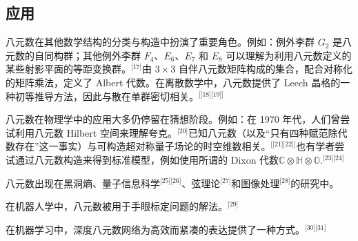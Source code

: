 \subsection{应用}
八元数在其他数学结构的分类与构造中扮演了重要角色。例如：例外李群 $G_{2}$ 是八元数的自同构群；其他例外李群 $F_{4}$、$E_{6}$、$E_{7}$ 和 $E_{8}$ 可以理解为利用八元数定义的某些射影平面的等距变换群。\(^\text{[17]}\)由 $3\times 3$ 自伴八元数矩阵构成的集合，配合对称化的矩阵乘法，定义了 Albert 代数。在离散数学中，八元数提供了 Leech 晶格的一种初等推导方法，因此与散在单群密切相关。\(^\text{[[18][19]]}\)

八元数在物理学中的应用大多仍停留在猜想阶段。例如：在 1970 年代，人们曾尝试利用八元数 Hilbert 空间来理解夸克。\(^\text{[20]}\)已知八元数（以及“只有四种赋范除代数存在”这一事实）与可构造超对称量子场论的时空维数相关。\(^\text{[[21][22]]}\)也有学者尝试通过八元数构造来得到标准模型，例如使用所谓的 Dixon 代数$\mathbb{C} \otimes \mathbb{H} \otimes \mathbb{O}$.\(^\text{[23][24]}\)

八元数出现在黑洞熵、量子信息科学\(^\text{[25][26]}\)、弦理论\(^\text{[27]}\)和图像处理\(^\text{[28]}\)的研究中。

在机器人学中，八元数被用于手眼标定问题的解法。\(^\text{[29]}\)

在机器学习中，深度八元数网络为高效而紧凑的表达提供了一种方式。\(^\text{[30][31]}\)

